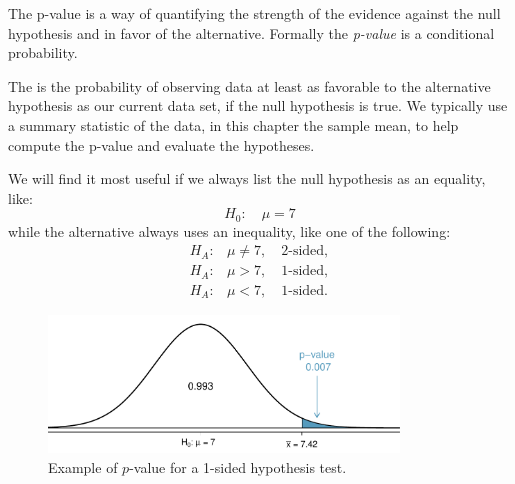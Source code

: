 
The p-value is a way of quantifying the strength of the evidence against the null hypothesis and in favor of the alternative. Formally the \emph{p-value} is a conditional probability.

\begin{termBox}{
The  is the probability of observing data at least as favorable to the alternative hypothesis as our current data set, if the null hypothesis is true. We typically use a summary statistic of the data, in this chapter the sample mean, to help compute the p-value and evaluate the hypotheses.}
\end{termBox}



\begin{tipBox}{
We will find it most useful if we always list the null hypothesis as an equality, like:
\[
H_0: \quad\mu = 7
\]
while the alternative always uses an inequality, like one of the following:
\begin{eqnarray*}
H_A:& \mu\neq7,\quad\text{2-sided},\\
H_A:& \mu>7,\quad\text{1-sided},\\
H_A:& \mu<7,\quad\text{1-sided}.
\end{eqnarray*}
}
\end{tipBox}

\begin{figure}%
   \centering
   \includegraphics[width=0.83\textwidth]{ch_inference_foundations/figures/pValueOneSidedSleepStudy/pValueOneSidedSleepStudy}
   \caption{Example of $p$-value for a 1-sided hypothesis test.}
   \label{pValueOneSidedSleepStudy}
\end{figure}

